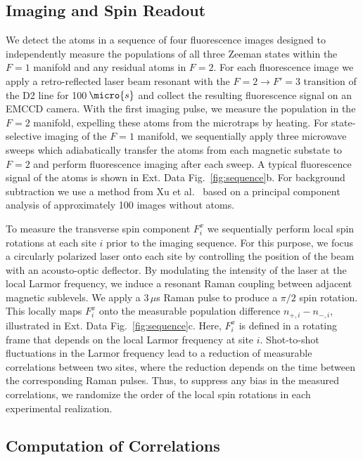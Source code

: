 \documentclass[aps,pra,superscriptaddress,12pt]{revtex4-1} %
\begin{document}
\begin{bibunit}
\subsection{Imaging and Spin Readout}
We detect the atoms in a sequence of four fluorescence images designed to independently measure the populations of all three Zeeman states within the $F=1$ manifold and any residual atoms in $F=2$. 
For each fluorescence image we apply a retro-reflected laser beam resonant with the $F=2 \rightarrow F' = 3$ transition of the D2 line for 100\,$\micro{s}$ and collect the resulting fluorescence signal on an EMCCD camera.
With the first imaging pulse, we measure the population in the $F=2$ manifold, expelling these atoms from the microtraps by heating.
For state-selective imaging of the $F = 1$ manifold, we sequentially apply three microwave sweeps which adiabatically transfer the atoms from each magnetic substate to $F=2$ and perform fluorescence imaging after each sweep.
A typical fluorescence signal of the atoms is shown in Ext. Data Fig.~\ref{fig:sequence}b.
For background subtraction we use a method from Xu et al.~\cite{xu2019probing} based on a principal component analysis of approximately 100 images without atoms.

To measure the transverse spin component $F^x_i$ we sequentially perform local spin rotations at each site $i$ prior to the imaging sequence. For this purpose, we focus a circularly polarized laser onto each site by controlling the position of the beam with an acousto-optic deflector. By modulating the intensity of the laser at the local Larmor frequency, we induce a resonant Raman coupling between adjacent magnetic sublevels. We apply a $3\,\mu$s Raman pulse to produce a $\pi/2$ spin rotation. This locally maps $F^x_i$ onto the measurable population difference $n_{+,i} - n_{-,i}$, illustrated in Ext. Data Fig.~\ref{fig:sequence}c. Here, $F^x_i$ is defined in a rotating frame that depends on the local Larmor frequency at site $i$.
Shot-to-shot fluctuations in the Larmor frequency lead to a reduction of measurable correlations between two sites, where the reduction depends on the time between the corresponding Raman pulses. Thus, to suppress any bias in the measured correlations, we randomize the order of the local spin rotations in each experimental realization.

\subsection{Computation of Correlations}


\end{bibunit}
\end{document}
